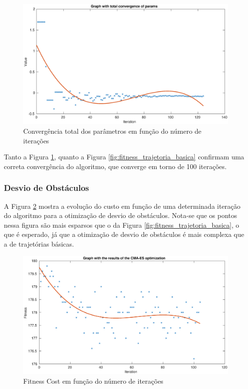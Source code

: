 \documentclass[10pt,fleqn,a4paper]{article}
\begin{document}
\begin{figure}[H]
	\centering
	\includegraphics[width=1.0\textwidth]{figures/CMA-ES_Total_parameter_convergence.eps}
	\caption{Convergência total dos parâmetros em função do número de iterações}
	\label{fig:convergencia_total_trajetoria_basica}
\end{figure}

Tanto a Figura \ref{fig:convergencia_total_trajetoria_basica}, quanto a Figura \ref{fig:fitness_trajetoria_basica} confirmam uma correta convergência do algoritmo, que converge em torno de 100 iterações.

\subsubsection{Desvio de Obstáculos}

A Figura \ref{fig:fitness_trajetoria_basica_ally} mostra a evolução do custo em função de uma determinada iteração do algoritmo para a otimização de desvio de obstáculos. Nota-se que os pontos nessa figura são mais esparsos que o da Figura \ref{fig:fitness_trajetoria_basica}, o que é esperado, já que a otimização de desvio de obstáculos é mais complexa que a de trajetórias básicas.

\begin{figure}[H]
	\centering
	\includegraphics[width=1.0\textwidth]{figures/CMA-ES_Fitness_Results_ally.eps}
	\caption{Fitness Cost em função do número de iterações}
	\label{fig:fitness_trajetoria_basica_ally}
\end{figure}
\end{document}
